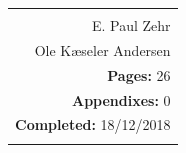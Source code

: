 \begin{titlepage}
{\begin{tabular}{r}
{	
	\textbf{Supervisors:}\\
	E. Paul Zehr \\
	Ole Kæseler Andersen\\
	
	\textbf{Pages:} 26\\
	\textbf{Appendixes:} 0 \\
	\textbf{Completed:} 18/12/2018\\
}
	
		\hfill \hspace{0.5cm} \parbox{10cm}{\begin{tabular}{l} %
				\fbox{
					\parbox{9.3cm}{\bigskip
						{\vfill{\small 
								\bigskip}}
				}}
	\end{tabular}}
\end{tabular}}


\end{titlepage}
%